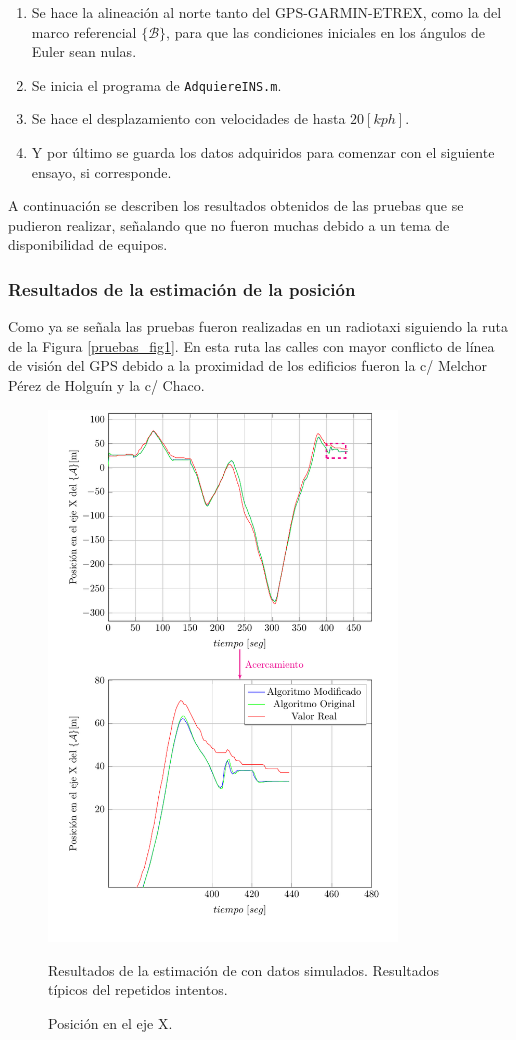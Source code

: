 \documentclass[conference]{IEEEtran}
\newcommand{\marco}[1]{\{\mathcal{#1}\}}
\begin{document}
\begin{enumerate}
\item Se hace la alineación al norte tanto del GPS-GARMIN-ETREX, como la del marco referencial $\marco{B}$, para que las condiciones iniciales en los ángulos de Euler sean nulas.
\item Se inicia el programa de \texttt{AdquiereINS.m}.
\item Se hace el desplazamiento con velocidades de hasta $20[kph]$.
\item Y por último se guarda los datos adquiridos para comenzar con el siguiente ensayo, si corresponde.
\end{enumerate}
A continuación se describen los resultados obtenidos de las pruebas que se pudieron realizar, señalando que no fueron muchas debido a un tema de disponibilidad de equipos.
\subsubsection{Resultados de la estimación de la posición}
Como ya se señala las pruebas fueron realizadas en un radiotaxi siguiendo la ruta de la Figura \ref{pruebas_fig1}. En esta ruta las calles con mayor conflicto de línea de visión del GPS debido a la proximidad de los edificios fueron la c/ Melchor Pérez de Holguín y la c/ Chaco.\par
\begin{figure}
\begin{center}
\includegraphics[width=25em]
{PlotX4b.pdf}
\caption{Posición en el eje X.}
\scriptsize{Resultados de la estimación de con datos simulados. Resultados típicos del repetidos intentos.}
\label{PlotX1}
\end{center}
\end{figure}
\end{document}
